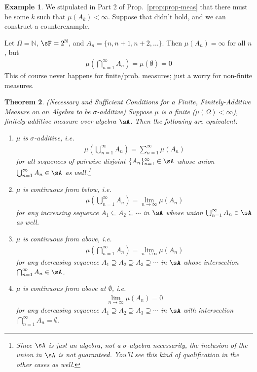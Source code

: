 \documentclass[12pt]{article}
\theoremstyle{plain}
\newtheorem{thm}{Theorem}[section]
\theoremstyle{definition}
\newtheorem{ex}[thm]{Example}
\theoremstyle{remark}
\newcommand{\sumninf}{\sum^\infty_{n=1}}
\newcommand{\ninf}{_{n=1}^\infty}
\begin{document}
\begin{ex}
We stipulated in Part 2 of Prop.~\ref{prop:prop-meas} that there must be
some $k$ such that $\mu(A_k)<\infty$.  Suppose that didn't hold, and we
can construct a counterexample.

Let $\Omega = \mathbb{N}$, $\sF =2^\mathbb{N}$, and
$A_n = \{n, n+1, n+2, \ldots\}$. Then $\mu(A_n) = \infty$ for all
$n$, but
\begin{align*}
  \mu\left(\bigcap^\infty_{n=1} A_n\right) =
  \mu(\emptyset) = 0
\end{align*}
This of course never happens for finite/prob. measures;
just a worry for non-finite measures.
\end{ex}

\begin{thm}
\emph{(Necessary and Sufficient Conditions for a Finite,
Finitely-Additive Measure on an Algebra to be $\sigma$-additive)}
Suppose $\mu$ is a finite \emph{($\mu(\Omega)<\infty$)},
finitely-additive measure over algebra $\sA$. Then the following are
equivalent:
\begin{enumerate}
  \item $\mu$ is $\sigma$-additive, i.e.
    \begin{align*}
      \mu\left(\bigcup_{n=1}^\infty A_n\right)
      =
      \sumninf \mu\left( A_n\right)
    \end{align*}
    for all sequences of pairwise disjoint $\{A_n\}\ninf\in\sA$
    whose union $\bigcup_{n=1}^\infty A_n\in\sA$ as well.\footnote{%
    Since $\sA$ is just an algebra, not a $\sigma$-algebra necessarily,
    the inclusion of the union in $\sA$ is not guaranteed. You'll see
    this kind of qualification in the other cases as well.}

  \item $\mu$ is continuous from below, i.e.
    \begin{align*}
      \mu\left(\bigcup^\infty_{n=1} A_n\right) =
      \lim_{n\rightarrow\infty} \mu(A_n)
    \end{align*}
    for any increasing sequence $A_1\subseteq A_2 \subseteq \cdots$ in
    $\sA$ whose union $\bigcup_{n=1}^\infty A_n\in\sA$ as well.

  \item $\mu$ is continuous from above, i.e.
    \begin{align*}
      \mu\left(\bigcap^\infty_{n=1} A_n\right)
      = \lim_{n\rightarrow\infty} \mu(A_n)
    \end{align*}
    for any decreasing sequence
    $A_1 \supseteq A_2 \supseteq A_3 \supseteq \cdots$ in $\sA$ whose
    intersection $\bigcap_{n=1}^\infty A_n \in \sA$.

  \item $\mu$ is continuous from above at $\emptyset$, i.e.
    \begin{align*}
      \lim_{n\rightarrow\infty} \mu(A_n)
      =0
    \end{align*}
    for any decreasing sequence
    $A_1 \supseteq A_2 \supseteq A_3 \supseteq \cdots$ in $\sA$
    with
    intersection $\bigcap_{n=1}^\infty A_n = \emptyset$.
\end{enumerate}
\end{thm}
\end{document}
